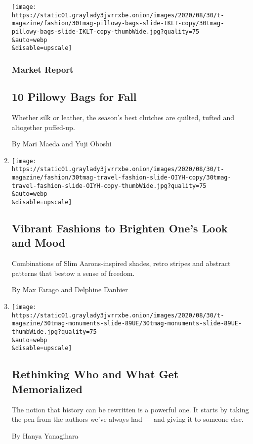 \begin{enumerate}
  \texttt{[image: https://static01.graylady3jvrrxbe.onion/images/2020/08/30/t-magazine/fashion/30tmag-pillowy-bags-slide-IKLT-copy/30tmag-pillowy-bags-slide-IKLT-copy-thumbWide.jpg?quality=75\\\&auto=webp\\\&disable=upscale]}

  \hypertarget{market-report}{%
  \subsubsection{Market Report}\label{market-report}}

  \hypertarget{10-pillowy-bags-for-fall}{%
  \subsection{10 Pillowy Bags for Fall}\label{10-pillowy-bags-for-fall}}

  Whether silk or leather, the season's best clutches are quilted,
  tufted and altogether puffed-up.

  By Mari Maeda and Yuji Oboshi
\item
  \href{/2020/08/24/t-magazine/fall-womens-fashion-bright-patterns.html}{}

  \texttt{[image: https://static01.graylady3jvrrxbe.onion/images/2020/08/30/t-magazine/fashion/30tmag-travel-fashion-slide-OIYH-copy/30tmag-travel-fashion-slide-OIYH-copy-thumbWide.jpg?quality=75\\\&auto=webp\\\&disable=upscale]}

  \hypertarget{vibrant-fashions-to-brighten-ones-look-and-mood}{%
  \subsection{Vibrant Fashions to Brighten One's Look and
  Mood}\label{vibrant-fashions-to-brighten-ones-look-and-mood}}

  Combinations of Slim Aarons-inspired shades, retro stripes and
  abstract patterns that bestow a sense of freedom.

  By Max Farago and Delphine Danhier
\item
  \href{/2020/08/24/t-magazine/monuments-womens-fashion-issue.html}{}

  \texttt{[image: https://static01.graylady3jvrrxbe.onion/images/2020/08/30/t-magazine/30tmag-monuments-slide-89UE/30tmag-monuments-slide-89UE-thumbWide.jpg?quality=75\\\&auto=webp\\\&disable=upscale]}

  \hypertarget{rethinking-who-and-what-get-memorialized}{%
  \subsection{Rethinking Who and What Get
  Memorialized}\label{rethinking-who-and-what-get-memorialized}}

  The notion that history can be rewritten is a powerful one. It starts
  by taking the pen from the authors we've always had --- and giving it
  to someone else.

  By Hanya Yanagihara
\end{enumerate}

